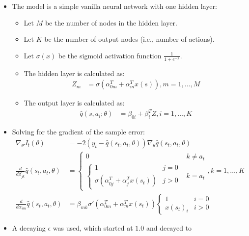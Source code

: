 \documentclass[a4paper]{article}
\begin{document}
\begin{itemize}
    \item The model is a simple vanilla neural network with one hidden layer:
    \begin{itemize}
        \item Let $M$ be the number of nodes in the hidden layer.
        \item Let $K$ be the number of output nodes (i.e., number of actions).
        \item Let $\sigma(x)$ be the sigmoid activation function
            $\frac{1}{1 + e^{-x}}$.
        \item The hidden layer is calculated as:
        \begin{align*}
            Z_{m} &= \sigma(\alpha^{T}_{0m} + \alpha^{T}_{m}x(s)), m = 1, \dots, M
        \end{align*}
        \item The output layer is calculated as:
        \begin{align*}
            \hat{q}(s, a_i; \theta) &= \beta_{0i} + \beta^{T}_{i}Z, i = 1, \dots, K
        \end{align*}
    \end{itemize}
    \item Solving for the gradient of the sample error:
    \begin{align*}
        \nabla_{\theta}J_t(\theta) &= -2(y_t - \hat{q}(s_t, a_t, \theta))
        \nabla_{\theta}\hat{q}(s_t, a_t, \theta)\\
        \frac{d}{d\beta_{jk}}\hat{q}(s_t, a_t, \theta) &=
        \begin{cases}
            0 & k \ne a_t\\
            \begin{cases}
                1 & j = 0\\
                \sigma(\alpha^{T}_{0j} + \alpha^{T}_{j}x(s_t)) & j > 0
            \end{cases} &  k = a_t
        \end{cases}, k = 1, \dots, K\\
        \frac{d}{d\alpha_{im}}\hat{q}(s_t, a_t, \theta) &=
        \beta_{mk}
        \sigma'(\alpha^{T}_{0m} + \alpha^{T}_{m}x(s_t))
        \begin{cases}
            1 & i = 0\\
            x(s_t)_{i} & i > 0
        \end{cases}
    \end{align*}
    \item A decaying $\epsilon$ was used, which started at $1.0$ and decayed to

\end{itemize}
\end{document}
